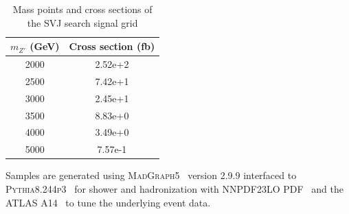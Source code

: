 \begin{table}
\centering
  \begin{tabular}{ |c|c| }
    \hline
    $m_{Z'}$ (GeV) & Cross section (fb)  \\
    \hline
     2000 &  2.52e+2 \\
     2500 &  7.42e+1 \\
     3000 &  2.45e+1\\ 
     3500 &   8.83e+0\\
     4000 &  3.49e+0 \\ 
     5000 &  7.57e-1 \\
    \hline
  \end{tabular}
  \caption{Mass points and cross sections of the SVJ search signal grid}
  \label{tab:sig_grid}
\end{table}

Samples are generated using 
\textsc{MadGraph5}~\cite{Alwall:2014hca} version 2.9.9 interfaced to 
\textsc{Pythia8.244p3}~\cite{pythia} for shower and hadronization with 
NNPDF23LO PDF~\cite{Butterworth:2015oua} and the 
ATLAS A14~\cite{Skands:2014pea} to tune the underlying event data.
